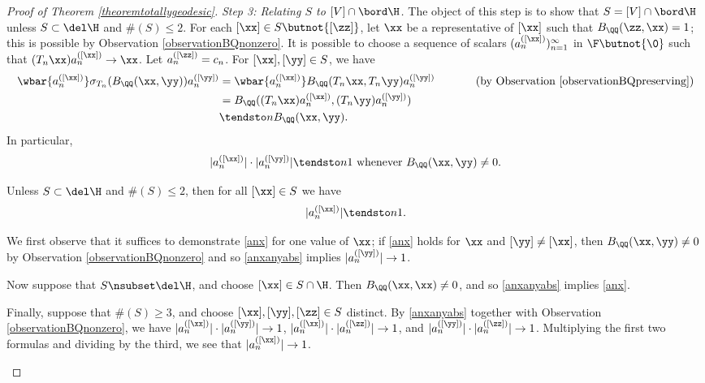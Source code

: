 \begin{proof}[Proof of Theorem \ref{theoremtotallygeodesic}]
{\it Step 3: Relating $S$ to $[V]\cap\bord\H$.}
The object of this step is to show that $S = [V]\cap\bord\H$ unless $S\subset\del\H$ and $\#(S)\leq 2$. For each $[\xx]\in S\butnot\{[\zz]\}$, let $\xx$ be a representative of $[\xx]$ such that $B_\QQ(\zz,\xx) = 1$; this is possible by Observation \ref{observationBQnonzero}. It is possible to choose a sequence of scalars $(a_n^{([\xx])})_{n = 1}^\infty$ in $\F\butnot\{\0\}$ such that $(T_n\xx) a_n^{([\xx])}\to \xx$. Let $a_n^{([\zz])} = c_n$. For $[\xx],[\yy]\in S$, we have
\begin{equation}
\label{anxany}
\begin{split}
\wbar{a_n^{([\xx])}}\sigma_{T_n}(B_\QQ(\xx,\yy)) a_n^{([\yy])}
&= \wbar{a_n^{([\xx])}}B_\QQ(T_n\xx,T_n\yy) a_n^{([\yy])} \hspace{.5 in} \text{(by Observation \ref{observationBQpreserving})}\\
&= B_\QQ((T_n\xx) a_n^{([\xx])},(T_n\yy) a_n^{([\yy])})\\
&\tendsto n B_\QQ(\xx,\yy).
\end{split}
\end{equation}
In particular,
\begin{equation}
\label{anxanyabs}
|a_n^{([\xx])}|\cdot|a_n^{([\yy])}| \tendsto n 1 \text{ whenever }B_\QQ(\xx,\yy)\neq 0.
\end{equation}
\begin{claim}
Unless $S\subset\del\H$ and $\#(S)\leq 2$, then for all $[\xx]\in S$ we have
\begin{equation}
\label{anx}
|a_n^{([\xx])}|\tendsto n 1.
\end{equation}
\end{claim}
\begin{subproof}
We first observe that it suffices to demonstrate \eqref{anx} for one value of $\xx$; if \eqref{anx} holds for $\xx$ and $[\yy]\neq[\xx]$, then $B_\QQ(\xx,\yy)\neq 0$ by Observation \ref{observationBQnonzero} and so \eqref{anxanyabs} implies $|a_n^{([\yy])}|\to 1$.

Now suppose that $S\nsubset\del\H$, and choose $[\xx]\in S\cap\H$. Then $B_\QQ(\xx,\xx)\neq 0$, and so \eqref{anxanyabs} implies \eqref{anx}.

Finally, suppose that $\#(S)\geq 3$, and choose $[\xx],[\yy],[\zz]\in S$ distinct. By \eqref{anxanyabs} together with Observation \ref{observationBQnonzero}, we have $|a_n^{([\xx])}|\cdot|a_n^{([\yy])}| \to 1$, $|a_n^{([\xx])}|\cdot|a_n^{([\zz])}| \to 1$, and $|a_n^{([\yy])}|\cdot|a_n^{([\zz])}| \to 1$. Multiplying the first two formulas and dividing by the third, we see that $|a_n^{([\xx])}|\to 1$.
\end{subproof}


\end{proof}

